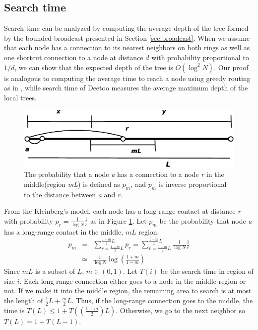 \documentclass[conference]{IEEEtran}
\begin{document}
\subsection{Search time}
\label{sec:search_time}
Search time can be analyzed by computing the average
depth of the tree formed by the bounded broadcast presented in
Section \ref{sec:broadcast}. When we assume that each node 
has a connection to its nearest neighbors on both rings as well as
one shortcut connection to a node at distance $d$ with probability
proportional to $1/d$, we can show that the expected depth of the 
tree is $O(\log^2 N)$. 
Our proof is analogous to computing the average time 
to reach a node using greedy routing as in \cite{jk:Information,
pr:Symphony}, while search time of 
Deetoo measures the average maximum depth of the local trees.
\begin{figure}
\centering
\includegraphics[width=3 in]{searchtime}
\caption{The probability that a node \textit{a} has a connection to a node \textit{r} 
in the middle(region \textit{mL}) is defined as $p_{m}$, and $p_m$ is inverse 
proportional to the distance between \textit{a} and \textit{r}.} \label{fig:search}
\end{figure}
From the Kleinberg's model, each node has a long-range
contact at distance \textit{r} with probability 
$p_{r}=\frac{1}{\log N}\frac{1}{r}$ as in Figure \ref{fig:search}. 
Let \textit{$p_{m}$} be the probability that node \textit{a} has a long-range
contact in the middle, \textit{$mL$} region.
\begin{eqnarray*}
p_{m} &=& \sum_{r=\frac{1-m}{2}L}^{\frac{1+m}{2}L}p_{r} = \sum_{r=\frac{1-m}{2}L}^{\frac{1+m}{2}L}\frac{1}{\log
        N}\frac{1}{r}\\
        &\simeq& \frac{1}{\log N}\log\left(\frac{1+m}{1-m}\right)
\end{eqnarray*}
Since \textit{$mL$} is a subset of \textit{$L$},
$m\in (0,1)$. 
Let $T(i)$ be the search time in region of size $i$.
Each long range connection either goes to a node in the
middle region or not.
If we make it into the middle region, the remaining area
to search is at most the length of $\frac{1}{2}L + \frac{m}{2}L$.
Thus,
if the long-range connection goes to the middle, the time is 
$T(L) \leq 1 + T((\frac{1+m}{2})L)$. 
Otherwise, we go to the next neighbor so $T(L) = 1 + T(L-1)$.
\end{document}
